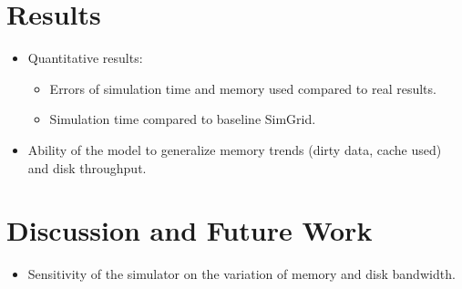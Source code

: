 \documentclass[conference]{IEEEtran}
\begin{document}
	\section{Results}
	
		\begin{itemize}

			\item Quantitative results: 
				\begin{itemize}
					\item Errors of simulation time and memory used compared to real results.
					\item Simulation time compared to baseline SimGrid.
				\end{itemize} 

			\item Ability of the model to generalize memory trends (dirty data, cache used) and disk throughput.

		\end{itemize}

	\section{Discussion and Future Work}
		\begin{itemize}
			\item Sensitivity of the simulator on the variation of memory and disk bandwidth. 
		\end{itemize}


\end{document}
